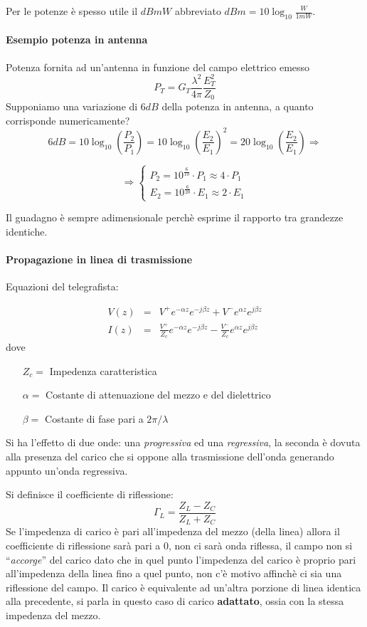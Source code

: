 Per le potenze è spesso utile il $\si{dB}mW $ abbreviato $\si{dB}m = 10\log_{10}\frac{W}{1 mW}$.

\paragraph{Esempio potenza in antenna}
Potenza fornita ad un'antenna in funzione del campo elettrico emesso
$$P_T = G_T \frac{\lambda^2}{4\pi}\frac{E_T^2}{Z_0}$$
Supponiamo una variazione di $6 \si{dB}$ della potenza in antenna, a quanto corrisponde numericamente?
$$6\si{dB} = 10\log_{10}\left(\frac{P_2}{P_1} \right) = 10\log_{10}\left(\frac{E_2}{E_1}\right)^2 =
20\log_{10}\left(\frac{E_2}{E_1}\right) \Rightarrow$$

$$\Rightarrow
\begin{cases}
 P_2 = 10^{\frac{6}{10}}\cdot P_1 \approx 4\cdot P_1 \\
 E_2 = 10^{\frac{6}{20}}\cdot E_1 \approx 2\cdot E_1
\end{cases}
$$

Il guadagno è sempre adimensionale perchè esprime il rapporto tra grandezze identiche.

\paragraph{Propagazione in linea di trasmissione}
Equazioni del telegrafista:

\begin{eqnarray*}
 V(z) &=& V^+e^{-\alpha z} e^{-j\beta z} + V^-e^{\alpha z}e^{j\beta z}  \\
 I(z) &=& \frac{V^+}{Z_c}e^{-\alpha z} e^{-j\beta z} - \frac{V^-}{Z_c}e^{\alpha z}e^{j\beta z}
\end{eqnarray*}
dove
\begin{itemize}
 \item[$Z_c =$] Impedenza caratteristica
 \item[$\alpha =$] Costante di attenuazione del mezzo e del dielettrico
 \item[$\beta =$] Costante di fase pari a $2\pi/\lambda$
\end{itemize}


Si ha l'effetto di due onde: una \textit{progressiva} ed una \textit{regressiva}, la seconda è dovuta alla
presenza del carico che si oppone alla trasmissione dell'onda generando appunto un'onda regressiva.

Si definisce il coefficiente di riflessione:
$$ 
\Gamma_L = \frac{Z_L - Z_C}{Z_L + Z_C}
$$
Se l'impedenza di carico è pari all'impedenza del mezzo (della linea) allora il coefficiente di riflessione
sarà pari a 0, non ci sarà onda riflessa, il campo non si ``\textit{accorge}'' del carico dato che
in quel punto l'impedenza del carico è proprio pari all'impedenza della linea fino a quel punto, non c'è motivo affinchè
ci sia una riflessione del campo. Il carico è equivalente ad un'altra porzione di linea identica alla precedente, si
parla in questo caso di carico \textbf{adattato}, ossia con la stessa impedenza del mezzo.

